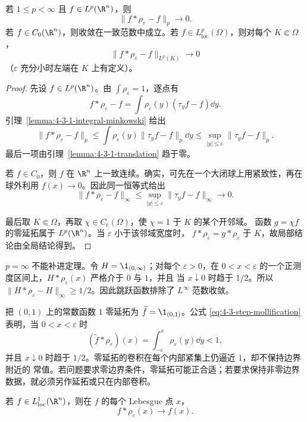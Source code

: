 \begin{theorem}[近似恒等]\label{theorem:4-3-1-2}
若 $1\leq p<\infty$ 且 $f\in L^p(\R^n)$，则
\[
 \|f*\rho_\varepsilon-f\|_p\longrightarrow0.
 \tag{4.3.2}\label{eq:4-3-mollifier-lp}
\]
若 $f\in C_0(\R^n)$，则收敛在一致范数中成立。若
$f\in L^p_{\mathrm{loc}}(\Omega)$，则对每个 $K\Subset\Omega$，
\[
 \|f*\rho_\varepsilon-f\|_{L^p(K)}\longrightarrow0
\]
（$\varepsilon$ 充分小时左端在 $K$ 上有定义）。
\end{theorem}

\begin{proof}
先设 $f\in L^p(\R^n)$。由 $\int\rho_\varepsilon=1$，逐点有
\[
 f*\rho_\varepsilon-f
 =\int\rho_\varepsilon(y)(\tau_yf-f)\dd y.
\]
引理~\ref{lemma:4-3-1-integral-minkowski} 给出
\[
 \|f*\rho_\varepsilon-f\|_p
 \leq\int\rho_\varepsilon(y)\|\tau_yf-f\|_p\dd y
 \leq\sup_{|y|\leq\varepsilon}\|\tau_yf-f\|_p.
\]
最后一项由引理~\ref{lemma:4-3-1-translation} 趋于零。

若 $f\in C_0$，则 $f$ 在 $\R^n$ 上一致连续。确实，可先在一个大闭球上用紧致性，再在球外利用
$f(x)\to0$。因此同一恒等式给出
\[
 \|f*\rho_\varepsilon-f\|_\infty
 \leq\sup_{|y|\leq\varepsilon}\|\tau_yf-f\|_\infty\longrightarrow0.
\]

最后取 $K\Subset\Omega$，再取 $\chi\in C_c(\Omega)$，使 $\chi=1$ 于 $K$ 的某个开邻域。
函数 $g=\chi f$ 的零延拓属于 $L^p(\R^n)$。当 $\varepsilon$ 小于该邻域宽度时，
$f*\rho_\varepsilon=g*\rho_\varepsilon$ 于 $K$，故局部结论由全局结论得到。
\end{proof}

$p=\infty$ 不能补进定理。令 $H=\1_{(0,\infty)}$；对每个 $\varepsilon>0$，在
$0<x<\varepsilon$ 的一个正测度区间上，$H*\rho_\varepsilon(x)$ 严格介于 $0$ 与 $1$，并且
当 $x\downarrow0$ 时趋于 $1/2$。所以
$\|H*\rho_\varepsilon-H\|_\infty\geq1/2$。因此跳跃函数排除了 $L^\infty$ 范数收敛。

\begin{example}[边界泄漏]\label{ex:4-3-1-3}
把 $(0,1)$ 上的常数函数 $1$ 零延拓为 $\widetilde f=\1_{(0,1)}$。公式
\eqref{eq:4-3-step-mollification} 表明，当 $0<x<\varepsilon$ 时
\[
 (\widetilde f*\rho_\varepsilon)(x)
 =\int_{-\varepsilon}^{x}\rho_\varepsilon(y)\dd y<1,
\]
并且 $x\downarrow0$ 时趋于 $1/2$。零延拓的卷积在每个内部紧集上仍逼近 $1$，却不保持边界附近的
常值。若问题要求零边界条件，零延拓可能正合适；若要求保持非零边界数据，就必须另作延拓或只在内部卷积。
\end{example}

\begin{proposition}\label{proposition:4-3-1-4}
若 $f\in L^1_{\mathrm{loc}}(\R^n)$，则在 $f$ 的每个 Lebesgue 点 $x$，
\[
 f*\rho_\varepsilon(x)\longrightarrow f(x).
\]
\end{proposition}

